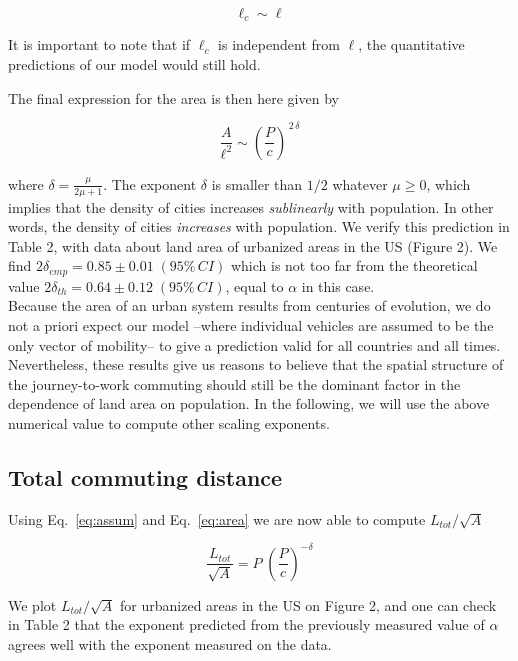 \begin{equation}
    \ell_c \sim \ell
\end{equation}

It is important to note that if $\ell_c$ is independent from $\ell$, the
quantitative predictions of our model would still hold. 

The final expression for the area is then here given by

\begin{equation}
    \frac{A}{\ell^2} \sim \left( \frac{P}{c} \right)^{\,2\,\delta}
    \label{eq:area}
\end{equation}

where $\delta=\frac{\mu}{2\mu+1}$. The exponent $\delta$ is smaller than $1/2$
whatever $\mu\geq 0$, which implies that the density of cities increases
\emph{sublinearly} with population. In other words, the density of cities
\emph{increases}  with population. We verify this prediction in Table 2, with
data about land area of urbanized areas in the US (Figure 2). We find $2
\delta_{emp} = 0.85 \pm 0.01\; (95\%\, CI)$ which is not too far from the
theoretical value $2\delta_{th} = 0.64 \pm 0.12\; (95\%\, CI)$, equal to
$\alpha$ in this case.\\

Because the area of an urban system results from centuries of evolution, we do
not a priori expect our model --where individual vehicles are assumed to be the
only vector of mobility-- to give a prediction valid for all countries and all
times. Nevertheless, these results give us reasons to believe that the spatial
structure of the journey-to-work commuting should still be the dominant factor
in the dependence of land area on population. In the following, we will use the
above numerical value to compute other scaling exponents.


\subsection{Total commuting distance}

Using Eq.~\ref{eq:assum} and Eq.~\ref{eq:area} we are now able to compute $L_{tot}/\sqrt{A}$

\begin{equation}
    \frac{L_{tot}}{\sqrt{A}} = P\; \left(\frac{P}{c}\right)^{-\delta}
    \label{eq:travelled_length}
\end{equation}

We plot $L_{tot} / \sqrt{A}$ for urbanized areas in the US on Figure 2, and one
can check in Table 2 that the exponent predicted from the previously measured
value of $\alpha$ agrees well with the exponent measured on the data.


